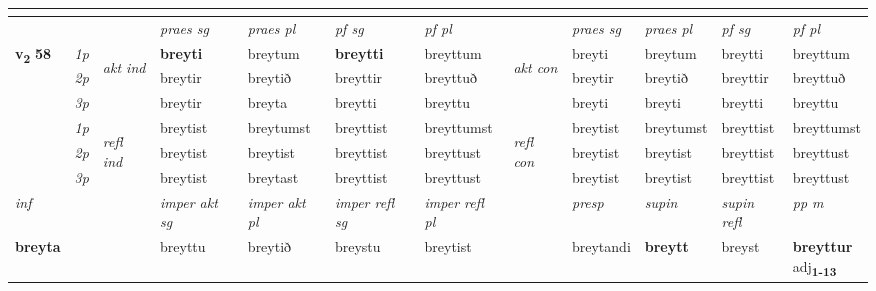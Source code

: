\begin{longtable}[l]{X>{\footnotesize\itshape}llXXXXlXXXX}
\midrule
& \\
\midrule
 & &   & \textit{praes sg}  & \textit{praes pl}    & \textit{ pf sg} & \textit{pf pl} & & \textit{praes sg}  & \textit{praes pl}    & \textit{pf sg} & \textit{pf pl }  \\ \cmidrule{4-7} \cmidrule{9-12}
 \multirow{2}{*}{{{\textbf{v{\textsubscript{2}}} \Large{\textbf{58}}}}}  & 1p & \multirow{3}{*}{\begin{turn}{90}\textit{akt ind}\end{turn}} & \textbf{breyti} & breytum & \textbf{breytti} & breyttum & \multirow{3}{*}{\begin{turn}{90}\textit{akt con}\end{turn}} &breyti & breytum & breytti & breyttum\\*
 & 2p &  &  breytir  & breytið & breyttir & breyttuð & & breytir & breytið & breyttir & breyttuð \\*
 & 3p &  & breytir & breyta & breytti & breyttu & & breyti & breyti& breytti & breyttu \\*
\cmidrule{4-7} \cmidrule{9-12}
 & 1p & \multirow{3}{*}{\begin{turn}{90}\textit{refl ind}\end{turn}}  & breytist & breytumst & breyttist & breyttumst & \multirow{3}{*}{\begin{turn}{90}\textit{refl con}\end{turn}}  &breytist & breytumst & breyttist & breyttumst \\*
 & 2p &  & breytist & breytist & breyttist & breyttust & &breytist & breytist & breyttist & breyttust \\*
 & 3p  & & breytist & breytast & breyttist & breyttust & & breytist & breytist& breyttist & breyttust \\*
\cmidrule{4-7} \cmidrule{9-12}

   {\textit{inf}} & &  & \textit{imper akt sg} & \textit{imper akt pl} & \textit{imper refl sg} & \textit{imper refl pl} && \textit{presp} & \textit{supin} & \textit{supin refl} & \textit{pp m} \\*
  {\textbf{breyta}} & && breyttu  & breytið & breystu & breytist && breytandi &  \textbf{breytt} & breyst & \specialcell{\textbf{breyttur} \\ adj\textbf{\textsubscript{1-13}}} \\*

\midrule


\end{longtable}

